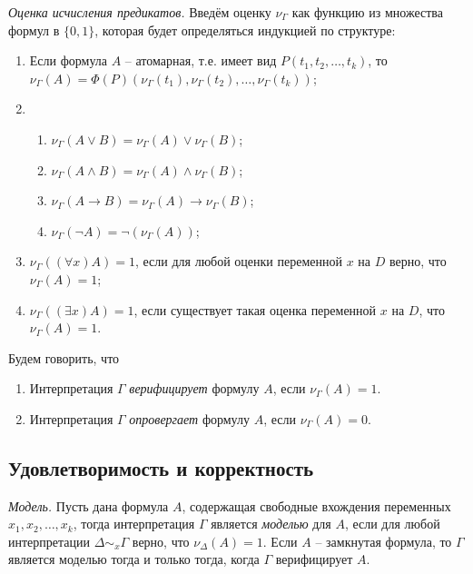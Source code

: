 \begin{definition}
  \emph{Оценка исчисления предикатов.} Введём оценку $\nu_{\Gamma}$ как функцию из множества формул в $\{0, 1\}$, которая будет определяться индукцией по структуре:
  \begin{enumerate}
  	\item Если формула $A$ -- атомарная, т.е. имеет вид $P(t_1, t_2, \ldots, t_k)$, то $\nu_{\Gamma}(A) = \Phi(P)(\nu_{\Gamma}(t_1), \nu_{\Gamma}(t_2), \ldots, \nu_{\Gamma}(t_k))$;
  	\item \begin{enumerate}
    		\item $\nu_\Gamma(A \vee B) = \nu_\Gamma(A) \vee \nu_\Gamma(B)$;
    		\item $\nu_\Gamma(A \wedge B) = \nu_\Gamma(A) \wedge \nu_\Gamma(B)$;
    		\item $\nu_\Gamma(A \rightarrow B) = \nu_\Gamma(A) \rightarrow \nu_\Gamma(B)$;
    		\item $\nu_\Gamma(\neg A) = \neg(\nu_\Gamma(A))$;
    	  \end{enumerate}
    \item $\nu_\Gamma((\forall x)A) = 1$, если для любой оценки переменной $x$ на $D$ верно, что $\nu_\Gamma(A) = 1$;
    
    \item $\nu_\Gamma((\exists x)A) = 1$, если существует такая оценка переменной $x$ на $D$, что $\nu_\Gamma(A) = 1$.
  \end{enumerate}
\end{definition}

Будем говорить, что 
\begin{enumerate}
	\item Интерпретация $\Gamma$ \textit{верифицирует} формулу $A$, если $\nu_{\Gamma}(A) = 1$.
	\item Интерпретация $\Gamma$ \textit{опровергает} формулу $A$, если $\nu_{\Gamma}(A) = 0$.
\end{enumerate}

\subsection{Удовлетворимость и корректность}

\begin{definition}
  \emph{Модель.} Пусть дана формула $A$, содержащая свободные вхождения переменных $x_1, x_2, \ldots, x_k$, тогда интерпретация $\Gamma$ является \textit{моделью} для $A$, если для любой интерпретации $\Delta \sim_x \Gamma$ верно, что $\nu_{\Delta}(A) = 1$. Если $A$ -- замкнутая формула, то $\Gamma$ является моделью тогда и только тогда, когда $\Gamma$ верифицирует $A$.
\end{definition}


